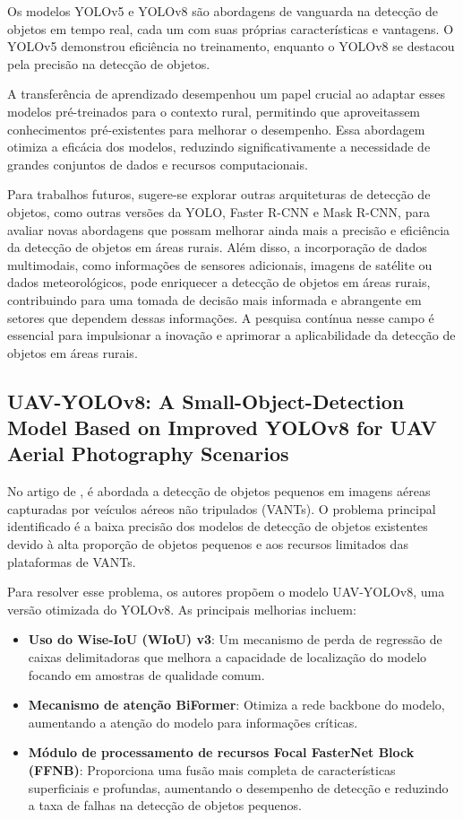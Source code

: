 Os modelos YOLOv5 e YOLOv8 são abordagens de vanguarda na detecção de objetos em tempo real, cada um com suas próprias características e vantagens. O YOLOv5 demonstrou eficiência no treinamento, enquanto o YOLOv8 se destacou pela precisão na detecção de objetos.

A transferência de aprendizado desempenhou um papel crucial ao adaptar esses modelos pré-treinados para o contexto rural, permitindo que aproveitassem conhecimentos pré-existentes para melhorar o desempenho. Essa abordagem otimiza a eficácia dos modelos, reduzindo significativamente a necessidade de grandes conjuntos de dados e recursos computacionais.

Para trabalhos futuros, sugere-se explorar outras arquiteturas de detecção de objetos, como outras versões da YOLO, Faster R-CNN e Mask R-CNN, para avaliar novas abordagens que possam melhorar ainda mais a precisão e eficiência da detecção de objetos em áreas rurais. Além disso, a incorporação de dados multimodais, como informações de sensores adicionais, imagens de satélite ou dados meteorológicos, pode enriquecer a detecção de objetos em áreas rurais, contribuindo para uma tomada de decisão mais informada e abrangente em setores que dependem dessas informações. A pesquisa contínua nesse campo é essencial para impulsionar a inovação e aprimorar a aplicabilidade da detecção de objetos em áreas rurais.

\subsection{UAV-YOLOv8: A Small-Object-Detection Model Based on Improved YOLOv8 for UAV Aerial Photography Scenarios}

No artigo de \cite{wang2023uav}, é abordada a detecção de objetos pequenos em imagens aéreas capturadas por veículos aéreos não tripulados (VANTs). O problema principal identificado é a baixa precisão dos modelos de detecção de objetos existentes devido à alta proporção de objetos pequenos e aos recursos limitados das plataformas de VANTs.

Para resolver esse problema, os autores propõem o modelo UAV-YOLOv8, uma versão otimizada do YOLOv8. As principais melhorias incluem:

\begin{itemize}
    \item \textbf{Uso do Wise-IoU (WIoU) v3}: Um mecanismo de perda de regressão de caixas delimitadoras que melhora a capacidade de localização do modelo focando em amostras de qualidade comum.
    \item \textbf{Mecanismo de atenção BiFormer}: Otimiza a rede backbone do modelo, aumentando a atenção do modelo para informações críticas.
    \item \textbf{Módulo de processamento de recursos Focal FasterNet Block (FFNB)}: Proporciona uma fusão mais completa de características superficiais e profundas, aumentando o desempenho de detecção e reduzindo a taxa de falhas na detecção de objetos pequenos.
\end{itemize}

